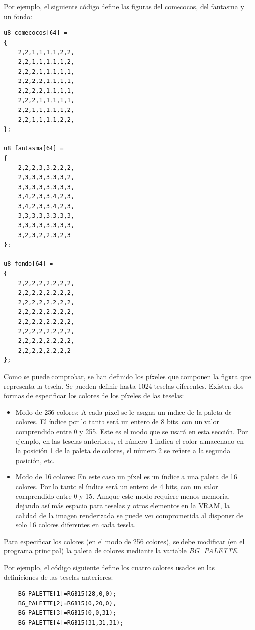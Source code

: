 Por ejemplo, el siguiente código define las figuras del comecocos, del fantasma y un fondo:

\begin{lstlisting}
u8 comecocos[64] =
{
	2,2,1,1,1,1,2,2,
	2,2,1,1,1,1,1,2,
	2,2,2,1,1,1,1,1,
	2,2,2,2,1,1,1,1,
	2,2,2,2,1,1,1,1,
	2,2,2,1,1,1,1,1,
	2,2,1,1,1,1,1,2,
	2,2,1,1,1,1,2,2,
};

u8 fantasma[64] =
{
	2,2,2,3,3,2,2,2,
	2,3,3,3,3,3,3,2,
	3,3,3,3,3,3,3,3,
	3,4,2,3,3,4,2,3,
	3,4,2,3,3,4,2,3,
	3,3,3,3,3,3,3,3,
	3,3,3,3,3,3,3,3,
	3,2,3,2,2,3,2,3
};

u8 fondo[64] =
{
	2,2,2,2,2,2,2,2,
	2,2,2,2,2,2,2,2,
	2,2,2,2,2,2,2,2,
	2,2,2,2,2,2,2,2,
	2,2,2,2,2,2,2,2,
	2,2,2,2,2,2,2,2,
	2,2,2,2,2,2,2,2,
	2,2,2,2,2,2,2,2
};
\end{lstlisting}

Como se puede comprobar, se han definido los píxeles que componen la figura que representa la tesela. Se pueden definir hasta 1024 teselas diferentes. Existen dos formas de especificar los colores de los píxeles de las teselas:

\begin{itemize}
\item Modo de 256 colores: A cada píxel se le asigna un índice de la paleta de colores. El índice por lo tanto será un entero de 8 bits, con un valor comprendido entre 0 y 255. Este es el modo que se usará en esta sección. Por ejemplo, en las teselas anteriores, el número 1 indica el color almacenado en la posición 1 de la paleta de colores, el número 2 se refiere a la segunda posición, etc. 
%
\item Modo de 16 colores: En este caso un píxel es un índice a una paleta de 16 colores. Por lo tanto el índice será un entero de 4 bits, con un valor comprendido entre 0 y 15. Aunque este modo requiere menos memoria, dejando así más espacio para teselas y otros elementos en la VRAM, la calidad de la imagen renderizada se puede ver comprometida al disponer de solo 16 colores diferentes en cada tesela.
\end{itemize}

Para especificar los colores (en el modo de 256 colores), se debe modificar (en el programa principal) la paleta de colores mediante la variable \textit{BG\_PALETTE}. 

Por ejemplo, el código siguiente define los cuatro colores usados en las definiciones de las teselas anteriores:

\begin{lstlisting}
	BG_PALETTE[1]=RGB15(28,0,0);
	BG_PALETTE[2]=RGB15(0,20,0);
	BG_PALETTE[3]=RGB15(0,0,31);
	BG_PALETTE[4]=RGB15(31,31,31);
\end{lstlisting}
	
